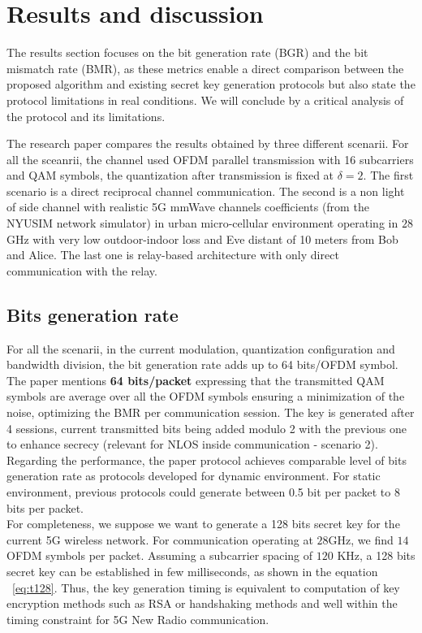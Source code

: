 \chapter{Results and discussion}

The results section focuses on the bit generation rate (BGR) and the bit mismatch rate (BMR), as these metrics enable a direct comparison between the proposed algorithm and existing secret key generation protocols but also state the protocol limitations in real conditions.  
We will conclude by a critical analysis of the protocol and its limitations.  

The research paper compares the results obtained by three different scenarii. For all the sceanrii, the channel used OFDM parallel transmission with 16 subcarriers and QAM symbols, the quantization after transmission is fixed at $\delta = 2$.  The first scenario is a direct reciprocal channel communication. The second is a non light of side channel with realistic 5G mmWave channels coefficients (from the NYUSIM network simulator) in urban micro-cellular environment operating in $28$ GHz with very low outdoor-indoor loss and Eve distant of 10 meters from Bob and Alice. The last one is relay-based architecture with only direct communication with the relay.

\section{Bits generation rate}
For all the scenarii, in the current modulation,  quantization configuration and bandwidth division, the bit generation rate adds up to 64 bits/OFDM symbol.  The paper mentions \textbf{64 bits/packet} expressing that the transmitted QAM symbols are average over all the OFDM symbols ensuring a minimization of the noise, optimizing the BMR per communication session.  The key is generated after 4 sessions, current transmitted bits being added modulo 2 with the previous one to enhance secrecy (relevant for NLOS inside communication - scenario 2).  Regarding the performance, the paper protocol achieves comparable level of bits generation rate as protocols developed for dynamic environment.  For static environment, previous protocols could generate between 0.5 bit per packet to 8 bits per packet.\\  For completeness, we suppose we want to generate a 128 bits secret key for the current 5G wireless network.  For communication operating at $28$GHz, we find $14$ OFDM symbols per packet.  Assuming a subcarrier spacing of $120$ KHz, a 128 bits secret key can be established in few milliseconds, as shown in the equation ~\ref{eq:t128}. Thus, the key generation timing is equivalent to computation of key encryption methods such as RSA or handshaking methods and well within the timing constraint for 5G New Radio communication. 

